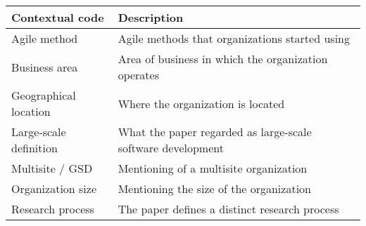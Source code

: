 \centering

 \label{agilemethodstable}
\begin{tabular}{ p{20em} p{30em}}
    \bfseries{Contextual code} & \bfseries{Description} \\
    \hline
    Agile method & Agile methods that organizations started using \\
    Business area & Area of business in which the organization operates \\
    Geographical location & Where the organization is located \\
    Large-scale definition & What the paper regarded as large-scale software development \\
    Multisite / GSD & Mentioning of a multisite organization \\
    Organization size & Mentioning the size of the organization \\
    Research process & The paper defines a distinct research process \\
    \hline
\end{tabular}
\justify
